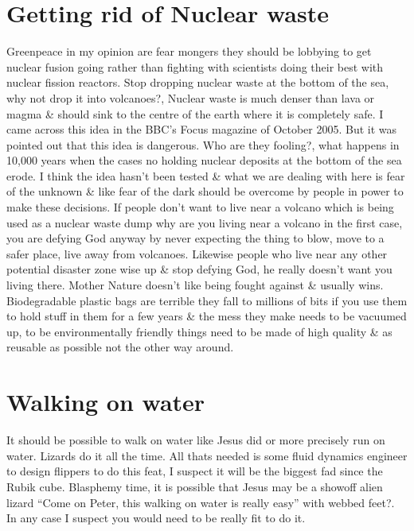 \documentclass[a4paper,12pt,titlepage]{book}
\begin{document}
\section{Getting rid of Nuclear waste}
Greenpeace in my opinion are fear mongers they should be lobbying to
get nuclear fusion going rather than fighting with scientists
doing their best with nuclear fission reactors.
Stop dropping nuclear waste at the bottom of the sea,
why not drop it into volcanoes?,
Nuclear waste is much denser than lava or magma
\& should sink to the centre of the earth where
it is completely safe.
I came across this idea in the BBC's Focus magazine of October 2005.
But it was pointed out that this idea is dangerous.
Who are they fooling?, what happens in 10,000 years
when the cases no holding nuclear deposits at the bottom
of the sea erode.
I think the idea hasn't been tested \& what
we are dealing with here is fear of the unknown \&
like fear of the dark should be overcome by
people in power to make these decisions.
If people don't want to live near a volcano which
is being used as a nuclear waste dump why are
you living near a volcano in the first case,
you are defying God anyway by never expecting the thing
to blow, move to a safer place, live away from volcanoes.
Likewise people who live near any other potential disaster zone
wise up \& stop defying God, he really doesn't want you living there.
Mother Nature doesn't like being fought against \& usually wins.
Biodegradable plastic bags are terrible they fall to millions of bits
if you use them to hold stuff in them for a few years \& 
the mess they make needs to be vacuumed up,
to be environmentally friendly things need
to be made of high quality \& as reusable as possible not
the other way around. 

\section{Walking on water}
It should be possible to walk on water like Jesus
did or more precisely run on water. Lizards do
it all the time. All thats needed is some
fluid dynamics engineer to design flippers 
to do this feat, I suspect it will be the biggest
fad since the Rubik cube.
Blasphemy time, it is possible that Jesus
may be a showoff alien lizard 
``Come on Peter, this walking on water is really easy'' 
with webbed feet?.
In any case I suspect you would need to be really 
fit to do it.
\end{document}
